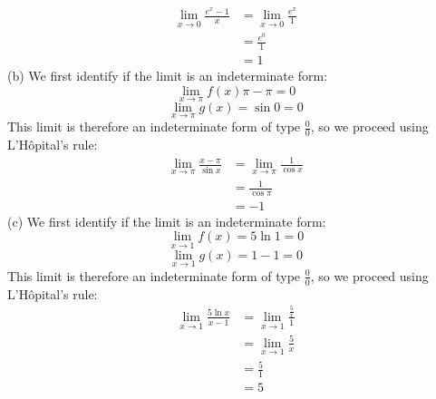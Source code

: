 \documentclass[11pt]{scrartcl}
\begin{document}
\begin{align*}
 \lim_{x \to 0} \frac{e^x-1}{x} &=\lim_{x \to 0} \frac{e^x}{1} \\          
                                &=\frac{e^0}{1} \\
                                &=1
\end{align*}
\noindent 
(b) We first identify if the limit is an indeterminate form: 
$$\lim_{x \to \pi}f(x)\pi-\pi=0$$
$$\lim_{x \to \pi}g(x)= \sin 0=0$$
\noindent 
This limit is therefore an indeterminate form of type $\frac{0}{0}$, so we proceed using L'Hôpital's rule:
\begin{align*}
\lim_{x \to \pi} \frac{x- \pi}{\sin x} &= \lim_{x \to \pi} \frac{1}{\cos x} \\
                                       &=\frac{1}{\cos \pi} \\
                                       &=-1
\end{align*}
\noindent 
(c) We first identify if the limit is an indeterminate form: 
$$\lim_{x \to 1}f(x)=5 \ln 1=0$$
$$\lim_{x \to 1}g(x)=1-1=0$$
This limit is therefore an indeterminate form of type $\frac{0}{0}$, so we proceed using L'Hôpital's rule:
\begin{align*}
\lim_{x \to 1} \frac{5 \ln x}{x-1} &= \lim_{x \to 1} \frac{\frac{5}{x}}{1} \\
                                   &=\lim_{x \to 1} \frac{5}{x} \\
                                   &=\frac{5}{1}\\
                                   &=5
\end{align*}
\end{document}
